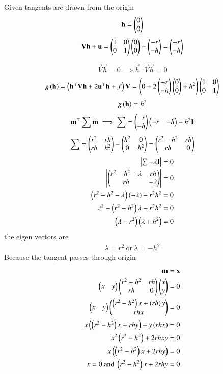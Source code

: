 \documentclass[journal]{IEEEtran}
\begin{document}
Given tangents are drawn from the origin
\begin{align}
    \mathbf{h}=\begin{pmatrix}0\\0\end{pmatrix}
\end{align}
\begin{align}
  \mathbf{V}\mathbf{h}+\mathbf{u}=\begin{pmatrix}1&0\\0&1\end{pmatrix}\begin{pmatrix}0\\0\end{pmatrix}+\begin{pmatrix}-r\\-h\end{pmatrix}=\begin{pmatrix}-r\\-h\end{pmatrix}
  \end{align}
  \begin{align}
   \vec{V}\vec{h}=0 \implies  \vec{h}^\top\vec{V}\vec{h}=0
   \end{align}
   \begin{align}
  g\left(\mathbf{h}\right)=\left(\mathbf{h}^{\top}\mathbf{V}\mathbf{h}+2\mathbf{u}^{\top}\mathbf{h} + f\right)\mathbf{V}=\left(0+2\begin{pmatrix}-r\\-h\end{pmatrix}\begin{pmatrix}0\\0\end{pmatrix}+h^2\right)\begin{pmatrix}1&0\\0&1\end{pmatrix}
\end{align}
\begin{align}
g\left(\mathbf{h}\right)=h^2
\end{align}
\begin{align}
\mathbf{m}^\top\sum\mathbf{m}\implies\sum=\begin{pmatrix}-r\\-h\end{pmatrix}\begin{pmatrix}-r&-h\end{pmatrix}-h^2\mathbf{I}
\end{align}
\begin{align}
\sum=\begin{pmatrix}r^2& rh \\rh &h^2\end{pmatrix}-\begin{pmatrix}h^2&0\\0&h^2\end{pmatrix}=\begin{pmatrix}r^2-h^2&rh\\rh&0\end{pmatrix}
\end{align}
\begin{align}
\begin{vmatrix}\sum-\lambda\mathbf{I}\end{vmatrix}=0\\
\begin{vmatrix}\begin{pmatrix}r^2-h^2-\lambda&rh\\rh&-\lambda\end{pmatrix}\end{vmatrix}=0\\
\left(r^2-h^2-\lambda\right)\left(-\lambda\right)-r^2h^2=0 \\
\lambda^2-\left(r^2-h^2\right)\lambda-r^2h^2=0\\
\left(\lambda-r^2\right)\left(\lambda+h^2\right)=0
\end{align}
the eigen vectors are
\begin{align}
    \lambda=r^2\ \text{or}\ \lambda=-h^2
\end{align}
 Because the tangent passes through  origin
 \begin{align}
     \mathbf{m}=\mathbf{x} \\
     \begin{pmatrix}x&y\end{pmatrix}\begin{pmatrix}r^2-h^2&rh\\rh&0\end{pmatrix}\begin{pmatrix}x\\y\end{pmatrix}=0 \\
     \begin{pmatrix}x&y\end{pmatrix}\begin{pmatrix}\left(r^2-h^2\right)x+\left(rh\right)y\\rhx\end{pmatrix}=0 \\
     x\begin{pmatrix}\left(r^2-h^2\right)x+rhy\end{pmatrix}+y\left(rhx\right)=0 \\
     x^2\left(r^2-h^2\right)+2rhxy=0 \\
     x\left(\left(r^2-h^2\right)x+2rhy\right)=0 \\
     x=0\ \text{and}\ \left(r^2-h^2\right)x+2rhy=0
 \end{align}
\end{document}
